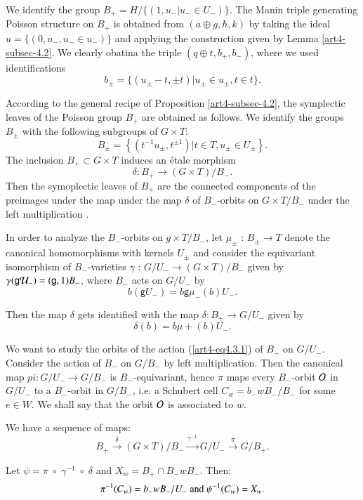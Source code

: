 We identify the group $B_{+}= H/\{(1,u_{-} | u_{-}\in U_{-})\}$. The Manin triple generating Poisson structure on $B_{+}$ is obtained from $(a \oplus g, \hbar, k)$ by taking the ideal $u=\{(0, u_{-}, u_{-} \in u_{-})\}$ and applying the construction given by Lemma \ref{art4-subsec-4.2}. We clearly obatina the triple $(q \oplus t, b_{+}, b_{-})$, where we used identifications
$$
b_{\pm} = \{(u_{\pm}-t, \pm t) | u_{\pm} \in u_{\pm}, t \in t\}.
$$

According to the general recipe of Proposition \ref{art4-subsec-4.2}, the symplectic leaves of the Poisson group $B_{+}$ are obtained as follows. We identify the groups $B_{\pm}$ with the following subgroups of $G\times T$:
$$
B_{\pm} =\left\{(t^{-1}u_{\pm}, t^{\pm 1}) | t \in T, u_{\pm} \in U_{\pm}\right\}.
$$
The inclusion $B_{+} \subset G\times T$ induces an \'etale morphism
$$
\delta: B_{+}\rightarrow (G\times T)/B_{-}.
$$
Then the symoplectic leaves of $B_{+}$ are the connected components of the preimages under the map under the map $\delta$ of $B_{-}$-orbits on $G\times T/B_{-}$ under the left multiplication .

In order to analyze the $B_{-}$-orbits on $g\times T/B_{-}$, let $\mu_{\pm}$ : $B_{\pm} \rightarrow T$ denote the canonical homomorphisms with kernels $U_{\pm}$ and consider the equivariant isomorphism of $B_{-}$-varieties $\gamma$ : $G/U_{-}\rightarrow (G\times T)/B_{-}$ given by $\gamma(\mathsf{g}\mathcal{U}_{-})= (\mathsf{g}, 1)B_{-}$, where $B_{-}$ acts on $G/U_{-}$ by  
\begin{equation}
b(\mathsf{g}U_{-}) = b\mathsf{g}\mu_{-}(b)U_{-}.\label{art4-eq4.3.1}
\end{equation}

\noindent
Then the map $\delta$ gets identified with the map $\delta : B_{+} \rightarrow G/U_{-}$ given by
$$
\delta(b)= b\mu{+}(b)U_{-}.
$$ 

We want to study the orbits of the action (\ref{art4-eq4.3.1}) of $B_{-}$ on $G/U_{-}$. Consider the action of $B_{-}$ on $G/B_{-}$ by left multiplication. Then the canonical map $pi: G/U_{-} \rightarrow G/B_{-}$ is $B_{-}$-equivariant, hence $\pi$ maps every $B_{-}$-orbit $\mathcal{O}$ in $G/U_{-}$ to a $B_{-}$-orbit in $G/B_{-}$, i.e. a Schubert cell $C_{w}= b_{-}wB_{-}/B_{-}$ for some $e \in W$. We shall say that the orbit $\mathcal{O}$ is associated to $w$.   

\begin{remark*}
We have a sequence of maps:
$$
B_{+} \xrightarrow{\delta}(G\times T)/B_{-} \xrightarrow{\gamma^{-1}}G/U_{-}\xrightarrow{\pi} G/B_{+}.
$$

Let $\psi = \pi \;\circ \; \gamma^{-1}\; \circ \; \delta$ and $X_{w} = B_{+} \cap B_{-}w B_{-}$. Then:
$$
\pi^{-1}(C_{w})= b_{-}wB_{-}/U_{-} \;\text{\rm and}\; \psi^{-1}(C_{w})= X_{w}.
$$
\end{remark*}

